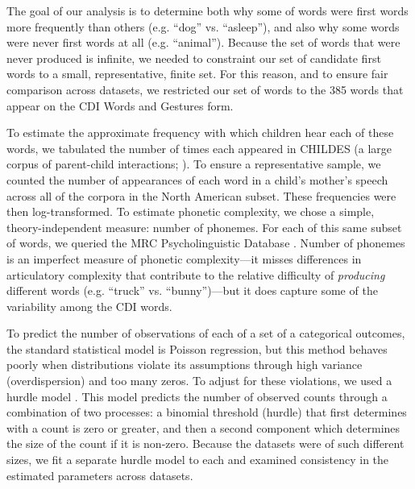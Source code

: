 \documentclass[10pt,letterpaper]{article}
\begin{document}
The goal of our analysis is to determine both why some of words were first words more frequently than others (e.g. ``dog'' vs. ``asleep''), and also why some words were never first words at all (e.g. ``animal''). Because the set of words that were never produced is infinite, we needed to constraint our set of candidate first words to a small, representative, finite set. For this reason, and to ensure fair comparison across datasets, we restricted our set of words to the 385 words that appear on the CDI Words and Gestures form. 


To estimate the approximate frequency with which children hear each of these words, we tabulated the number of times each appeared in CHILDES (a large corpus of parent-child interactions;  ). To ensure a representative sample, we counted the number of appearances of each word in a child's mother's speech across all of the corpora in the North American subset. These frequencies were then log-transformed.  To estimate phonetic complexity, we chose a simple, theory-independent measure: number of phonemes. For each of this same subset of words, we queried the MRC Psycholinguistic Database \cite{Wilson1988}. Number of phonemes is an imperfect measure of phonetic complexity---it misses differences in articulatory complexity that contribute to the relative difficulty of \emph{producing} different words (e.g. ``truck'' vs. ``bunny'')---but it does capture some of the variability among the CDI words.

To predict the number of observations of each of a set of a categorical outcomes, the standard statistical model is Poisson regression, but this method behaves poorly when distributions violate its assumptions through high variance (overdispersion) and too many zeros. To adjust for these violations, we used a hurdle model \cite{mullahy1986}. This model predicts the number of observed counts through a combination of two processes: a binomial threshold (hurdle) that first determines with a count is zero or greater, and then a second component which determines the size of the count if it is non-zero. Because the datasets were of such different sizes, we fit a separate hurdle model to each and examined consistency in the estimated parameters across datasets.
\end{document}
